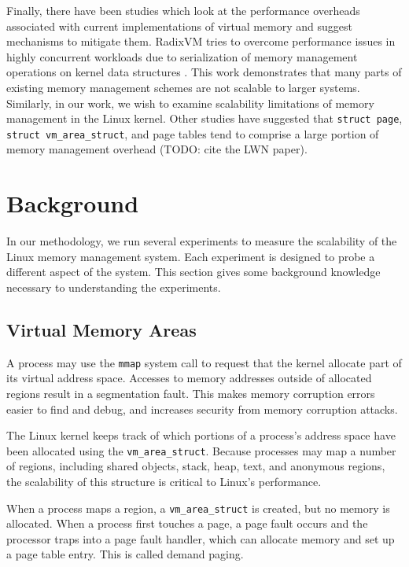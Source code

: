 \documentclass[twocolumn,11pt]{article}
\begin{document}
Finally, there have been studies which look at the performance overheads
associated with current implementations of virtual memory and suggest mechanisms
to mitigate them. RadixVM tries to overcome performance issues in highly
concurrent workloads due to serialization of memory management operations on
kernel data structures \cite{radixvm}. This work demonstrates that many parts of
existing memory management schemes are not scalable to larger systems.
Similarly, in our work, we wish to examine scalability limitations of memory
management in the Linux kernel. Other studies have suggested that \texttt{struct
page}, \texttt{struct vm\_area\_struct}, and page tables tend to comprise a
large portion of memory management overhead \cite{simics} (TODO: cite the LWN
paper).

\section{Background}

In our methodology, we run several experiments to measure the scalability of
the Linux memory management system. Each experiment is designed to probe a
different aspect of the system. This section gives some background knowledge
necessary to understanding the experiments.

\subsection{Virtual Memory Areas}

A process may use the \texttt{mmap} system call to request that the kernel
allocate part of its virtual address space. Accesses to memory addresses
outside of allocated regions result in a segmentation fault. This makes memory
corruption errors easier to find and debug, and increases security from memory
corruption attacks.

The Linux kernel keeps track of which portions of a process's address space
have been allocated using the \texttt{vm\_area\_struct}. Because processes may
map a number of regions, including shared objects, stack, heap, text, and
anonymous regions, the scalability of this structure is critical to Linux's
performance.

When a process maps a region, a \texttt{vm\_area\_struct} is created, but no
memory is allocated. When a process first touches a page, a page fault occurs
and the processor traps into a page fault handler, which can allocate memory
and set up a page table entry. This is called demand paging.
\end{document}
